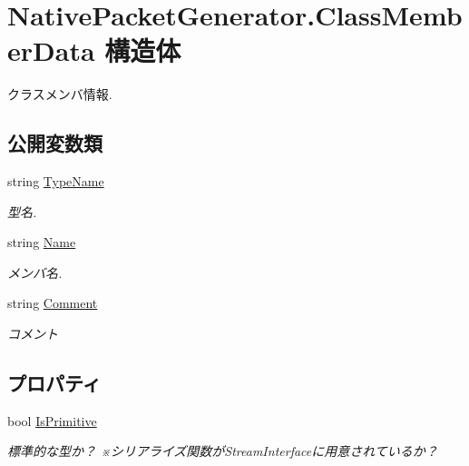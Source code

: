 \hypertarget{structNativePacketGenerator_1_1ClassMemberData}{}\section{Native\+Packet\+Generator.\+Class\+Member\+Data 構造体}
\label{structNativePacketGenerator_1_1ClassMemberData}


クラスメンバ情報.  


\subsection*{公開変数類}
\begin{DoxyCompactItemize}
\item 
string \mbox{\hyperlink{structNativePacketGenerator_1_1ClassMemberData_a4bceab9883ad5c8f1dae2b79b9dc487a}{Type\+Name}}
\begin{DoxyCompactList}\small\item\em 型名. \end{DoxyCompactList}\item 
string \mbox{\hyperlink{structNativePacketGenerator_1_1ClassMemberData_a4f3cebf9e74ba9d84a046560c0fa2e8c}{Name}}
\begin{DoxyCompactList}\small\item\em メンバ名. \end{DoxyCompactList}\item 
string \mbox{\hyperlink{structNativePacketGenerator_1_1ClassMemberData_a94b16417a4b930a311bce1cea2f67ed8}{Comment}}
\begin{DoxyCompactList}\small\item\em コメント \end{DoxyCompactList}\end{DoxyCompactItemize}
\subsection*{プロパティ}
\begin{DoxyCompactItemize}
\item 
bool \mbox{\hyperlink{structNativePacketGenerator_1_1ClassMemberData_a0b4726f9c2e7d121b85d0122d799be9c}{Is\+Primitive}}
\begin{DoxyCompactList}\small\item\em 標準的な型か？ ※シリアライズ関数が\+Stream\+Interfaceに用意されているか？ \end{DoxyCompactList}\end{DoxyCompactItemize}


